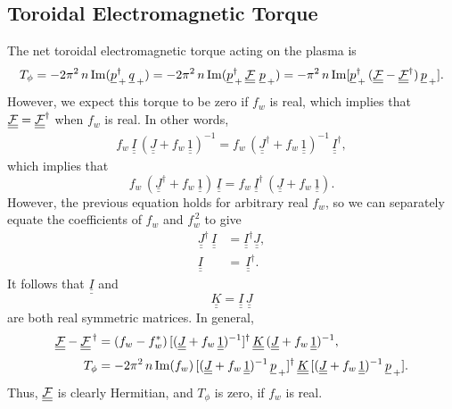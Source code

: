 \documentclass[12pt,prb,aps,notitlepage]{revtex4-1}
\begin{document}
\subsection{Toroidal Electromagnetic Torque}
The net toroidal electromagnetic torque acting on the plasma is
\begin{equation}\label{e85}
T_\phi=-2\pi^2\,n\, {\rm Im}(\underline{p}_{\,+}^\dag\,\underline{q}_{\,+})= -2\pi^2\,n\, {\rm Im}(\underline{p}_{\,+}^\dag\,\underline{\underline{\cal F}}\,\,\underline{p}_{\,+})
=-\pi^2\,n\,{\rm Im}[\underline{p}_{\,+}^\dag\,(\underline{\underline{\cal F}}-\underline{\underline{\cal F}}^\dag)\,\underline{p}_{\,+}].
\end{equation}
However, we expect this torque to be zero if $f_w$ is real, which implies that $\underline{\underline{\cal F}}=\underline{\underline{\cal F}}^\dag$
when $f_w$ is real. In other words,
\begin{align}
f_w\,\underline{\underline{I}}\,(\underline{\underline{J}}+ f_w\,\underline{\underline{1}})^{-1} =f_w\,(\underline{\underline{J}}^\dag+ f_w\,\underline{\underline{1}})^{-1}\,
\underline{\underline{I}}^\dag,
\end{align}
which implies that
\begin{equation}
f_w\,(\underline{\underline{J}}^\dag+ f_w\,\underline{\underline{1}})\,\underline{\underline{I}}=
f_w\, \underline{\underline{I}}^{\dag}\,(\underline{\underline{J}}+ f_w\,\underline{\underline{1}}).
\end{equation}
However, the previous equation holds for arbitrary real $f_w$, so we can separately equate the coefficients of $f_w$ and $f_w^{\,2}$
to give
\begin{align}\label{e90a}
\underline{\underline{J}}^\dag\,\underline{\underline{I}}&= \underline{\underline{I}}^{\dag}\underline{\underline{J}},\\[0.5ex]
\underline{\underline{I}}&=\,\underline{\underline{I}}^{\dag}.\label{e91a}
\end{align}
It follows that $\underline{\underline{I}}$ and 
\begin{equation}
\underline{\underline{K}} =  \underline{\underline{I}}\,\underline{\underline{J}}
\end{equation}
 are both real symmetric matrices. In general,
\begin{align}
\underline{\underline{\cal F}}-\underline{\underline{\cal F}}^{\,\dag}&= (f_w-f_w^\ast)\,[(\underline{\underline{J}}+ f_w\,\underline{\underline{1}})^{-1}]^\dag\,\underline{\underline{K}}\,
(\underline{\underline{J}}+ f_w\,\underline{\underline{1}})^{-1},\\[0.5ex]
T_\phi &= -2\pi^2\,n\,{\rm Im}(f_w)\,[(\underline{\underline{J}}+ f_w\,\underline{\underline{1}})^{-1}\,\underline{p}_{\,+}]^\dag\,\underline{\underline{K}}\,
[(\underline{\underline{J}}+ f_w\,\underline{\underline{1}})^{-1}\,\underline{p}_{\,+}].
\end{align}
Thus, $\underline{\underline{\cal F}}$ is clearly Hermitian, and $T_\phi$ is zero,  if $f_w$ is real. 
\end{document}
